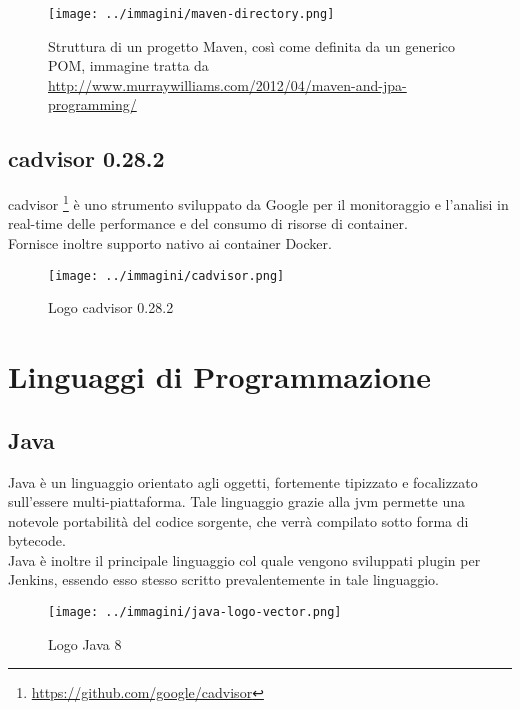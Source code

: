 \begin{figure}[H]
    \capstart
    \centering
    \texttt{[image: ../immagini/maven-directory.png]}
    \caption[Struttura di un progetto Maven, così come definita da un generico POM]{Struttura di un progetto Maven, così come definita da un generico POM, immagine tratta da \url{http://www.murraywilliams.com/2012/04/maven-and-jpa-programming/}}
\end{figure}

\subsection{cadvisor 0.28.2}
\label{subsec:cadvisor}

cadvisor \footnote{\url{https://github.com/google/cadvisor}} è uno strumento sviluppato da Google per il monitoraggio e l'analisi in real-time delle performance e del consumo di risorse di \gls{container}. \\
Fornisce inoltre supporto nativo ai \gls{container} Docker.

\begin{figure}[H]
    \capstart
    \centering
    \texttt{[image: ../immagini/cadvisor.png]}
    \caption{Logo cadvisor 0.28.2}
\end{figure}

\section{Linguaggi di Programmazione}
\subsection{Java}

Java è un linguaggio orientato agli oggetti, fortemente tipizzato e focalizzato sull'essere multi-piattaforma. Tale linguaggio grazie alla \gls{jvm} permette una notevole portabilità del codice sorgente, che verrà compilato sotto forma di \gls{bytecode}. \\

Java è inoltre il principale linguaggio col quale vengono sviluppati \gls{plugin} per Jenkins, essendo esso stesso scritto prevalentemente in tale linguaggio.

\begin{figure}[H]
    \capstart
    \centering
    \texttt{[image: ../immagini/java-logo-vector.png]}
    \caption{Logo Java 8}
\end{figure}

